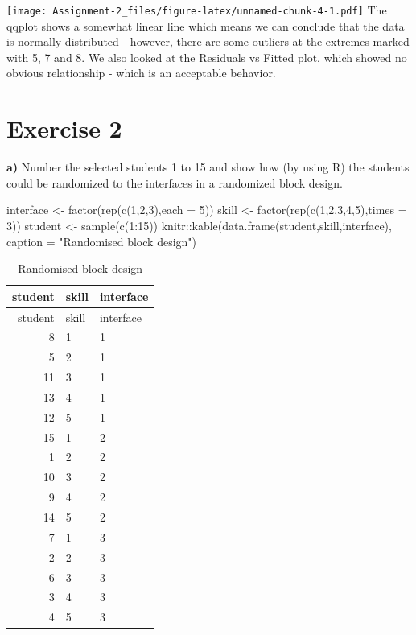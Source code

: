 \documentclass[
  10pt,
]{article}
\newenvironment{Shaded}{\begin{snugshade}}{\end{snugshade}}
\newcommand{\AttributeTok}[1]{\textcolor[rgb]{0.77,0.63,0.00}{#1}}
\newcommand{\DecValTok}[1]{\textcolor[rgb]{0.00,0.00,0.81}{#1}}
\newcommand{\FunctionTok}[1]{\textcolor[rgb]{0.00,0.00,0.00}{#1}}
\newcommand{\NormalTok}[1]{#1}
\newcommand{\OtherTok}[1]{\textcolor[rgb]{0.56,0.35,0.01}{#1}}
\newcommand{\SpecialCharTok}[1]{\textcolor[rgb]{0.00,0.00,0.00}{#1}}
\newcommand{\StringTok}[1]{\textcolor[rgb]{0.31,0.60,0.02}{#1}}
\begin{document}
\texttt{[image: Assignment-2\_files/figure-latex/unnamed-chunk-4-1.pdf]}
The qqplot shows a somewhat linear line which means we can conclude that
the data is normally distributed - however, there are some outliers at
the extremes marked with 5, 7 and 8. We also looked at the Residuals vs
Fitted plot, which showed no obvious relationship - which is an
acceptable behavior.

\hypertarget{exercise-2}{%
\section{Exercise 2}\label{exercise-2}}

\textbf{a)} Number the selected students 1 to 15 and show how (by using
R) the students could be randomized to the interfaces in a randomized
block design.

\begin{Shaded}
\begin{Highlighting}[]
\NormalTok{interface }\OtherTok{\textless{}{-}} \FunctionTok{factor}\NormalTok{(}\FunctionTok{rep}\NormalTok{(}\FunctionTok{c}\NormalTok{(}\DecValTok{1}\NormalTok{,}\DecValTok{2}\NormalTok{,}\DecValTok{3}\NormalTok{),}\AttributeTok{each =} \DecValTok{5}\NormalTok{))}
\NormalTok{skill }\OtherTok{\textless{}{-}} \FunctionTok{factor}\NormalTok{(}\FunctionTok{rep}\NormalTok{(}\FunctionTok{c}\NormalTok{(}\DecValTok{1}\NormalTok{,}\DecValTok{2}\NormalTok{,}\DecValTok{3}\NormalTok{,}\DecValTok{4}\NormalTok{,}\DecValTok{5}\NormalTok{),}\AttributeTok{times =} \DecValTok{3}\NormalTok{))}
\NormalTok{student }\OtherTok{\textless{}{-}} \FunctionTok{sample}\NormalTok{(}\FunctionTok{c}\NormalTok{(}\DecValTok{1}\SpecialCharTok{:}\DecValTok{15}\NormalTok{))}
\NormalTok{knitr}\SpecialCharTok{::}\FunctionTok{kable}\NormalTok{(}\FunctionTok{data.frame}\NormalTok{(student,skill,interface), }\AttributeTok{caption =} \StringTok{"Randomised block design"}\NormalTok{)}
\end{Highlighting}
\end{Shaded}

\begin{longtable}[]{@{}rll@{}}
\caption{Randomised block design}\tabularnewline
\toprule
student & skill & interface\tabularnewline
\midrule
\endfirsthead
\toprule
student & skill & interface\tabularnewline
\midrule
\endhead
8 & 1 & 1\tabularnewline
5 & 2 & 1\tabularnewline
11 & 3 & 1\tabularnewline
13 & 4 & 1\tabularnewline
12 & 5 & 1\tabularnewline
15 & 1 & 2\tabularnewline
1 & 2 & 2\tabularnewline
10 & 3 & 2\tabularnewline
9 & 4 & 2\tabularnewline
14 & 5 & 2\tabularnewline
7 & 1 & 3\tabularnewline
2 & 2 & 3\tabularnewline
6 & 3 & 3\tabularnewline
3 & 4 & 3\tabularnewline
4 & 5 & 3\tabularnewline
\bottomrule
\end{longtable}
\end{document}
